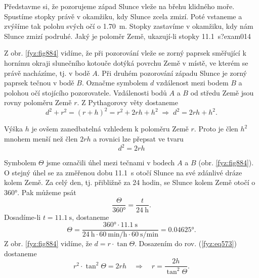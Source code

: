 \begin{fyzexam}{Představme si, že pozorujeme západ Slunce vleže na břehu klidného moře. Spustíme
  stopky právě v okamžiku, kdy Slunce zcela zmizí. Poté vstaneme a zvýšíme tak polohu svých očí o
  \SI{1.70}{\m}. Stopky zastavíme v okamžiku, kdy nám Slunce zmizí podruhé. Jaký je poloměr Země,
  ukazují-li stopky \SI{11.1}{\s}?}{exam014}

  {\centering
   \captionsetup{type=figure}
   \label{fyz:fig885}
   \par
  }

  Z obr. \ref{fyz:fig884} vidíme, že při pozorování vleže se zorný paprsek směřující k hornímu
  okraji slunečního kotouče dotýká povrchu Země v místě, ve kterém se právě nacházíme, tj. v bodě
  \(A\). Při druhém pozorování západu Slunce je zorný paprsek tečnou v bodě \(B\). Označme symbolem
  \(d\) vzdálenost mezi bodem \(B\) a polohou očí stojícího pozorovatele. Vzdálenosti bodů \(A\) a
  \(B\) od středu Země jsou rovny poloměru Země \(r\). Z Pythagorovy věty dostaneme
  \begin{equation*}
    d^2 + r^2 = (r + h)^2 = r^2 + 2rh + h^2\;\Rightarrow\; d^2 = 2rh + h^2.
  \end{equation*}

  Výška \(h\) je ovšem zanedbatelná vzhledem k poloměru Země \(r\). Proto je člen \(h^2\) mnohem
  menší než člen \(2rh\) a rovnici lze přepsat ve tvaru
  \begin{equation}\label{fyz:eq573}
    d^2 = 2rh
  \end{equation}

  Symbolem \(\varTheta\) jsme označili úhel mezi tečnami v bodech \(A\) a \(B\) (obr.
  \ref{fyz:fig884}). O stejný úhel se za změřenou dobu \SI{11.1}{\s} otočí Slunce na své zdánlivé
  dráze kolem Země. Za celý den, tj. přibližně za \num{24} hodin, se Slunce kolem Země otočí o
  \ang{360}. Pak můžeme psát
  \begin{equation*}
    \dfrac{\varTheta}{\ang{360}} = \dfrac{t}{\SI{24}{\hour}}.
  \end{equation*}
  Dosadíme-li \(t = \SI{11.1}{\s}\), dostaneme
  \begin{equation*}
    \varTheta = \dfrac{\ang{360}\cdot\SI{11.1}{\s}}
                      {\SI{24}{\hour}\cdot\SI{60}{\minute\per\hour}\cdot\SI{60}{\s\per\minute}}
              =\ang{0.04625}.
  \end{equation*}
  Z obr. \ref{fyz:fig884} vidíme, že \(d = r\cdot\tan{\varTheta}\). Dosazením do rov.
  (\ref{fyz:eq573}) dostaneme
  \begin{equation}\label{fyz:eq574}
    r^2\cdot\tan^2{\varTheta} = 2rh\quad\Rightarrow\quad 
    r = \dfrac{2h}{\tan^2{\varTheta}}.
  \end{equation}


\end{fyzexam}
